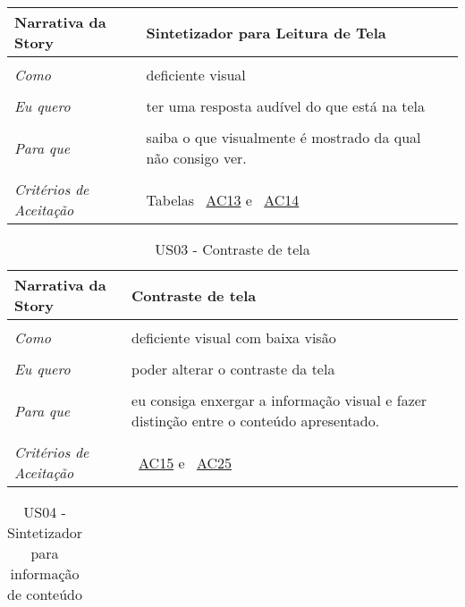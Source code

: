 \begin{apendicesenv}
\begin{table}[ht]
\begin{center}
\begin{tabularx}{\textwidth}{|lX|l|}
\hline 
\textbf{Narrativa da Story} & Sintetizador para Leitura de Tela \\
\hline
 & \\
\textit{Como} & deficiente visual \\
 & \\
\textit{Eu quero} & ter uma resposta audível do que está na tela \\
 & \\
\textit{Para que} & saiba o que visualmente é mostrado da qual não consigo ver. \\
 & \\
\hline
\textit{Critérios de Aceitação} & Tabelas ~\hyperref[tab:us01a13]{AC13} e ~\hyperref[tab:us01a14]{AC14} \\
\hline

\end{tabularx}
\end{center}
\label{tab:us02}
\end{table}

\begin{table}[ht]
\centering
\caption{US03 - Contraste de tela}
\vspace{0.1cm}
\begin{center}
\begin{tabularx}{\textwidth}{|lX|l|}
 
\hline 
\textbf{Narrativa da Story} & Contraste de tela \\
\hline
 & \\
\textit{Como} & deficiente visual com baixa visão \\
 & \\
\textit{Eu quero} & poder alterar o contraste da tela \\
 & \\
\textit{Para que} & eu consiga enxergar a informação visual e fazer distinção entre o conteúdo apresentado. \\
 & \\
\hline
\textit{Critérios de Aceitação} & ~\hyperref[tab:us01a15]{AC15} e ~\hyperref[tab:us01a25]{AC25} \\
\hline

\end{tabularx}
\end{center}
\label{tab:us03}
\end{table}


\begin{table}[ht]
\centering
\caption{US04 - Sintetizador para informação de conteúdo}
\vspace{0.1cm}
\begin{center}
\begin{tabularx}{\textwidth}{|lX|l|}


\end{tabularx}
\end{center}
\end{table}
\end{apendicesenv}

